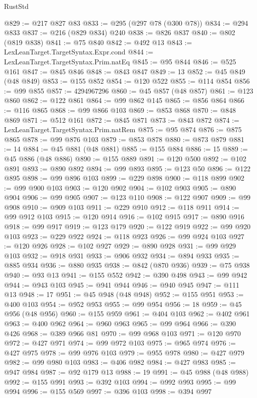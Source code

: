 \begin{lexlean}{RustStd}
\begin{coremodule}
@829 := @217 @827 @83
@833 := @295 (@297 @78 (@300 @78))
@834 := @294 @833
@837 := @216 (@829 @834) @240
@838 := @826 @837
@840 := @802 (@819 @838)
@841 := @75 @840
@842 := @492 @13
@843 := LexLeanTarget.TargetSyntax.Expr.cond
@844 := LexLeanTarget.TargetSyntax.Prim.natEq
@845 := @95 @844
@846 := @525 @161
@847 := @845 @846
@848 := @843 @847
@849 := 13
@852 := @45 @849 (@48 @849)
@853 := @155 @852
@854 := @120 @522
@855 := @114 @854
@856 := @99 @855
@857 := 4294967296
@860 := @45 @857 (@48 @857)
@861 := @123 @860
@862 := @122 @861
@864 := @99 @862 @145
@865 := @856 @864
@866 := @116 @865
@868 := @99 @866 @103
@869 := @853 @868
@870 := @848 @869
@871 := @512 @161
@872 := @845 @871
@873 := @843 @872
@874 := LexLeanTarget.TargetSyntax.Prim.natRem
@875 := @95 @874
@876 := @875 @865
@878 := @99 @876 @103
@879 := @853 @878
@880 := @873 @879
@881 := 14
@884 := @45 @881 (@48 @881)
@885 := @155 @884
@886 := 15
@889 := @45 @886 (@48 @886)
@890 := @155 @889
@891 := @120 @500
@892 := @102 @891
@893 := @890 @892
@894 := @99 @893
@895 := @123 @50
@896 := @122 @895
@898 := @99 @896 @103
@899 := @229 @898
@900 := @118 @899
@902 := @99 @900 @103
@903 := @120 @902
@904 := @102 @903
@905 := @890 @904
@906 := @99 @905
@907 := @123 @110
@908 := @122 @907
@909 := @99 @908
@910 := @909 @103
@911 := @229 @910
@912 := @118 @911
@914 := @99 @912 @103
@915 := @120 @914
@916 := @102 @915
@917 := @890 @916
@918 := @99 @917
@919 := @123 @179
@920 := @122 @919
@922 := @99 @920 @103
@923 := @229 @922
@924 := @118 @923
@926 := @99 @924 @103
@927 := @120 @926
@928 := @102 @927
@929 := @890 @928
@931 := @99 @929 @103
@932 := @918 @931
@933 := @906 @932
@934 := @894 @933
@935 := @885 @934
@936 := @880 @935
@938 := @842 (@870 @936)
@939 := @75 @938
@940 := @93 @13
@941 := @155 @552
@942 := @390 @498
@943 := @99 @942
@944 := @943 @103
@945 := @941 @944
@946 := @940 @945
@947 := @111 @13
@948 := 17
@951 := @45 @948 (@48 @948)
@952 := @155 @951
@953 := @400 @103
@954 := @952 @953
@955 := @99 @954
@956 := 18
@959 := @45 @956 (@48 @956)
@960 := @155 @959
@961 := @404 @103
@962 := @402 @961
@963 := @400 @962
@964 := @960 @963
@965 := @99 @964
@966 := @390 @426
@968 := @389 @966 @81
@970 := @99 @968 @103
@971 := @120 @970
@972 := @427 @971
@974 := @99 @972 @103
@975 := @965 @974
@976 := @427 @975
@978 := @99 @976 @103
@979 := @955 @978
@980 := @427 @979
@982 := @99 @980 @103
@983 := @406 @982
@984 := @427 @983
@985 := @947 @984
@987 := @92 @179 @13
@988 := 19
@991 := @45 @988 (@48 @988)
@992 := @155 @991
@993 := @392 @103
@994 := @992 @993
@995 := @99 @994
@996 := @155 @569
@997 := @396 @103
@998 := @394 @997

\end{coremodule}
\end{lexlean}
